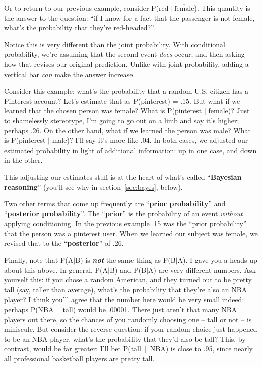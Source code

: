 Or to return to our previous example, consider P(red $|\
\overline{\textrm{female}}$). This quantity is the answer to the question: ``if
I know for a fact that the passenger is not female, what's the probability that
they're red-headed?''

Notice this is very different than the joint probability. With conditional
probability, we're assuming that the second event \textit{does} occur, and then
asking how that revises our original prediction. Unlike with joint probability,
adding a vertical bar \textit{can} make the answer increase.


Consider this example: what's the probability that a random U.S. citizen has a
Pinterest account? Let's estimate that as P(pinterest) = .15. But what if we
learned that the chosen person was female? What is P(pinterest $|$ female)?
Just to shamelessly stereotype, I'm going to go out on a limb and say it's
higher; perhaps .26. On the other hand, what if we learned the person was male?
What is P(pinterest $|$ male)? I'll say it's more like .04. In both cases, we
adjusted our estimated probability in light of additional information: up in
one case, and down in the other.


This adjusting-our-estimates stuff is at the heart of what's called
``\textbf{Bayesian reasoning}'' (you'll see why in section~\ref{sec:bayes},
below).


Two other terms that come up frequently are ``\textbf{prior probability}'' and
``\textbf{posterior probability}''. The ``\textbf{prior}'' is the probability of
an event \textit{without} applying conditioning. In the previous example .15
was the ``prior probability'' that the person was a pinterest user. When we
learned our subject was female, we revised that to the ``\textbf{posterior}''
of .26.


Finally, note that P(A$|$B) is \textbf{\textit{not}} the same thing as
P(B$|$A). I gave you a heads-up about this above. In general, P(A$|$B) and
P(B$|$A) are very different numbers. Ask yourself this: if you chose a random
American, and they turned out to be pretty tall (say, taller than average),
what's the probability that they're also an NBA player? I think you'll agree
that the number here would be very small indeed: perhaps P(NBA\ $|$\ tall)
would be .00001. There just aren't that many NBA players out there, so the
chances of you randomly choosing one -- tall or not -- is miniscule. But
consider the reverse question: if your random choice just happened to be an NBA
player, what's the probability that they'd also be tall? This, by contrast,
would be far greater: I'll bet P(tall\ $|$\ NBA) is close to .95, since nearly
all professional basketball players are pretty tall.

